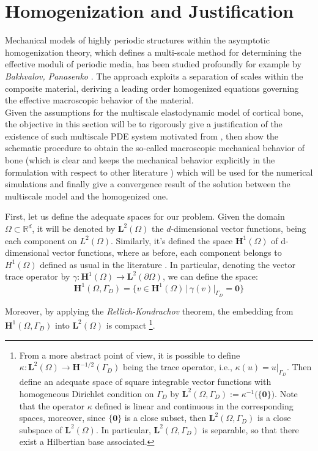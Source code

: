 \chapter{Homogenization and Justification}

Mechanical models of highly periodic structures within the asymptotic homogenization theory, which defines a multi-scale method for determining the effective moduli of periodic media, has been studied profoundly for example by \textit{Bakhvalov, Panasenko} \cite{bakhvalov1989homogenisation:}. The approach exploits a separation of scales within the composite material, deriving a leading order homogenized equations governing the effective macroscopic behavior of the material.\\

Given the assumptions for the multiscale elastodynamic model of cortical bone, the objective in this section will be to rigorously give a justification of the existence of such multiscale PDE system motivated from \cite{altenbach2018generalized}, then show the schematic procedure to obtain the so-called macroscopic mechanical behavior of bone (which is clear and keeps the mechanical behavior explicitly in the formulation with respect to other literature \cite{Parnell2008}) which will be used for the numerical simulations and finally give a convergence result of the solution between the multiscale model and the homogenized one. 

First, let us define the adequate spaces for our problem. Given the domain $\Omega \subset \mathbb{R}^d$, it will be denoted by $\mathbf{L}^2(\Omega)$ the $d$-dimensional vector functions, being each component on $L^2(\Omega)$. Similarly, it's defined the space $\mathbf{H}^1(\Omega)$ of d-dimensional vector functions, where as before, each component belongs to $H^1(\Omega)$ defined as usual in the literature \cite{evans2010partial}. 
In particular, denoting the vector trace operator by $\gamma: \mathbf{H}^1(\Omega) \rightarrow \mathbf{L}^2(\partial \Omega)$, we can define the space:
\begin{equation*}
    \mathbf{H}^1(\Omega, \Gamma_D) = \big \{ v \in \mathbf{H}^1(\Omega) \, \vert \, \gamma (v) \vert_{\Gamma_D} = \mathbf{0} \big \}
\end{equation*}

Moreover, by applying the \textit{Rellich-Kondrachov} theorem, the embedding from $\mathbf{H}^1(\Omega, \Gamma_D)$ into $\mathbf{L}^2(\Omega)$ is compact \footnote{From a more abstract point of view, it is possible to define $\kappa: \mathbf{L}^2( \Omega) \longrightarrow \mathbf{H}^{-1/2}(\Gamma_D)$ being the trace operator, i.e., $\kappa (u) = u \vert_{\Gamma_D}$. Then define an adequate space of square integrable vector functions with homogeneous Dirichlet condition on $\Gamma_D$ by $\mathbf{L}^2(\Omega, \Gamma_D) := \kappa^{-1}\big( \{ \mathbf{0}\}\big)$. Note that the operator $\kappa$ defined is linear and continuous in the corresponding spaces, moreover, since $\{\mathbf{0}\}$ is a close subset, then $\mathbf{L}^2(\Omega, \Gamma_D)$ is a close subspace of $\mathbf{L}^2(\Omega)$.
In particular, $\mathbf{L}^2(\Omega, \Gamma_D)$ is separable, so that there exist a Hilbertian base associated.}.

